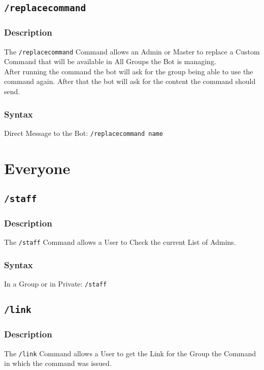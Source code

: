 \documentclass[a4paper]{article}
\begin{document}
    \subsection{\texttt{/replacecommand}}
        \subsubsection*{Description}
            The \texttt{/replacecommand} Command allows an Admin or Master to replace a Custom Command that will be available in All Groups the Bot is managing. \\
            After running the command the bot will ask for the group being able to use the command again. After that the bot will ask for the content the command should send.

        \subsubsection*{Syntax}
            Direct Message to the Bot: \texttt{/replacecommand name}\\


\newpage
\section{Everyone}
    \subsection{\texttt{/staff}}
        \subsubsection*{Description}
            The \texttt{/staff} Command allows a User to Check the current List of Admins.

        \subsubsection*{Syntax}
            In a Group or in Private: \texttt{/staff}\\

    \subsection{\texttt{/link}}
        \subsubsection*{Description}
            The \texttt{/link} Command allows a User to get the Link for the Group the Command in which the command was issued.
\end{document}
